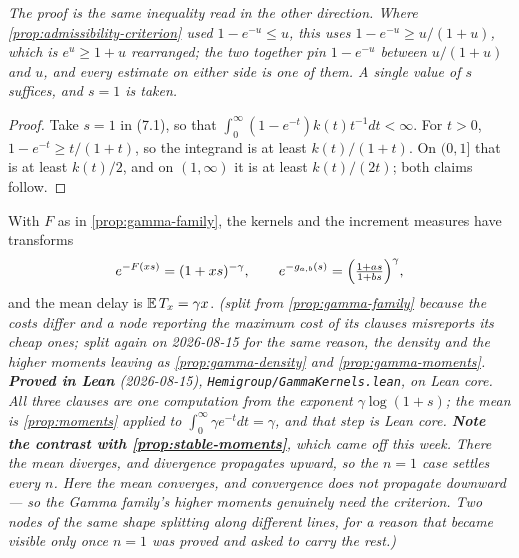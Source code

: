 \begin{lemma}
\emph{The proof is the same inequality read in the other direction. Where
\ref{prop:admissibility-criterion} used $1 - e^{-u} \le u$, this uses
$1 - e^{-u} \ge u/(1+u)$, which is $e^u \ge 1+u$ rearranged; the two together pin $1 - e^{-u}$
between $u/(1+u)$ and $u$, and every estimate on either side is one of them. A single value of
$s$ suffices, and $s = 1$ is taken.}
\end{lemma}

\begin{proof}
\leanok
Take $s = 1$ in (7.1), so that $\int_0^\infty (1 - e^{-t})k(t)t^{-1}dt < \infty$. For $t > 0$,
$1 - e^{-t} \ge t/(1+t)$, so the integrand is at least $k(t)/(1+t)$. On $(0,1]$ that is at least
$k(t)/2$, and on $(1,\infty)$ it is at least $k(t)/(2t)$; both claims follow.
\end{proof}

\begin{proposition}\label{prop:gamma-kernels}
\leanok
With $F$ as in \ref{prop:gamma-family}, the kernels and the increment measures have transforms
\[
  e^{-F(xs)} = (1 + x s)^{-\gamma}, \qquad
  e^{-g_{a,b}(s)} = \Bigl(\tfrac{1 + as}{1 + bs}\Bigr)^{\gamma},
\]
and the mean delay is $\mathbb{E}\,T_x = \gamma x$.
\statusT\quad\emph{(split from \ref{prop:gamma-family} because the costs differ and a node
reporting the maximum cost of its clauses misreports its cheap ones; split again on 2026-08-15 for
the same reason, the density and the higher moments leaving as \ref{prop:gamma-density} and
\ref{prop:gamma-moments}. \textbf{Proved in Lean} (2026-08-15),
\texttt{Hemigroup/GammaKernels.lean}, on Lean core. All three clauses are one computation from the
exponent $\gamma\log(1+s)$; the mean is \ref{prop:moments} applied to
$\int_0^\infty \gamma e^{-t}dt = \gamma$, and that step is Lean core.
\textbf{Note the contrast with \ref{prop:stable-moments}}, which came \emph{off}  this
week. There the mean diverges, and divergence propagates upward, so the $n = 1$ case settles every
$n$. Here the mean converges, and convergence does not propagate downward --- so the Gamma family's
higher moments genuinely need the criterion. Two nodes of the same shape splitting along different
lines, for a reason that became visible only once $n = 1$ was proved and asked to carry the rest.)}
\end{proposition}

